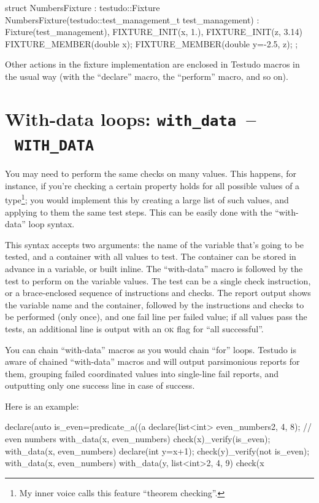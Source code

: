 \documentclass[twoside, a4paper, article]{memoir}
\newcommand*\testudocolor{\color{red!80!blue}}
\newcommand*\testudo[1]{\texttt{\testudocolor{}#1}}
\newcommand*\testudopair[2]{\testudo{#1}~--~\testudo{#2}}
\begin{document}
\begin{cpplisting}
struct NumbersFixture
    : testudo::Fixture
{
  NumbersFixture(testudo::test_management_t test_management)
    : Fixture(test_management),
      FIXTURE_INIT(x, 1.),
      FIXTURE_INIT(z, 3.14) { }
  FIXTURE_MEMBER(double x);
  FIXTURE_MEMBER(double y=-2.5, z);
};
\end{cpplisting}

Other actions in the fixture implementation are enclosed in Testudo macros in
the usual way (with the ``declare'' macro, the ``perform'' macro, and so on).


\chapter[With-data loops]{With-data loops:
  \testudopair{with\_data}{WITH\_DATA}}
\label{cha:with-data-loops}

You may need to perform the same checks on many values.  This happens, for
instance, if you're checking a certain property holds for all possible values
of a type\footnote{My inner voice calls this feature ``theorem checking''.};
you would implement this by creating a large list of such values, and applying
to them the same test steps.  This can be easily done with the ``with-data''
loop syntax.

This syntax accepts two arguments: the name of the variable that's going to be
tested, and a container with all values to test.  The container can be stored
in advance in a variable, or built inline.  The ``with-data'' macro is followed
by the test to perform on the variable values.  The test can be a single check
instruction, or a brace-enclosed sequence of instructions and checks.  The
report output shows the variable name and the container, followed by the
instructions and checks to be performed (only once), and one fail line per
failed value; if all values pass the tests, an additional line is output
with an \textsc{ok} flag for ``all successful''.

You can chain ``with-data'' macros as you would chain ``for'' loops.  Testudo
is aware of chained ``with-data'' macros and will output parsimonious reports
for them, grouping failed coordinated values into single-line fail reports, and
outputting only one success line in case of success.

Here is an example:
\begin{cpplisting}
declare(auto is_even=predicate_a((a%
declare(list<int> even_numbers{2, 4, 8}); // even numbers
with_data(x, even_numbers)
  check(x)_verify(is_even);
with_data(x, even_numbers) {
  declare(int y=x+1);
  check(y)_verify(not is_even);
}
with_data(x, even_numbers)
  with_data(y, list<int>{2, 4, 9})
    check(x%
\end{cpplisting}
\end{document}
